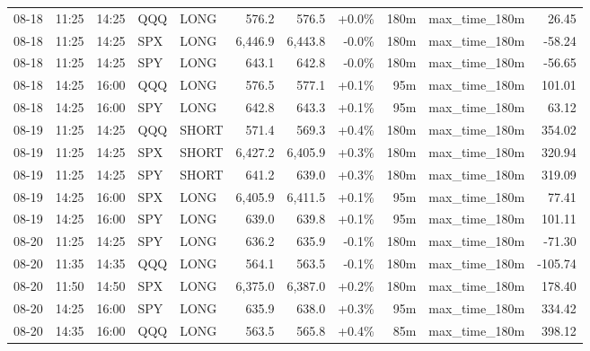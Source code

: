 \documentclass[11pt,a4paper,twoside]{article}
\begin{document}
\begin{center}
\begin{longtable}{>{\color{txtmain}}l l l l l r r r r >{\color{txtmain}}l r}
08-18 & 11:25 & 14:25 & QQQ & LONG & 576.2 & 576.5 & \textcolor{wingreen}{+0.0\%} & 180m & max\_time\_180m & \textcolor{wingreen}{26.45} \\
08-18 & 11:25 & 14:25 & SPX & LONG & 6,446.9 & 6,443.8 & \textcolor{lossred}{-0.0\%} & 180m & max\_time\_180m & \textcolor{lossred}{-58.24} \\
08-18 & 11:25 & 14:25 & SPY & LONG & 643.1 & 642.8 & \textcolor{lossred}{-0.0\%} & 180m & max\_time\_180m & \textcolor{lossred}{-56.65} \\
08-18 & 14:25 & 16:00 & QQQ & LONG & 576.5 & 577.1 & \textcolor{wingreen}{+0.1\%} & 95m & max\_time\_180m & \textcolor{wingreen}{101.01} \\
08-18 & 14:25 & 16:00 & SPY & LONG & 642.8 & 643.3 & \textcolor{wingreen}{+0.1\%} & 95m & max\_time\_180m & \textcolor{wingreen}{63.12} \\
08-19 & 11:25 & 14:25 & QQQ & SHORT & 571.4 & 569.3 & \textcolor{wingreen}{+0.4\%} & 180m & max\_time\_180m & \textcolor{wingreen}{354.02} \\
08-19 & 11:25 & 14:25 & SPX & SHORT & 6,427.2 & 6,405.9 & \textcolor{wingreen}{+0.3\%} & 180m & max\_time\_180m & \textcolor{wingreen}{320.94} \\
08-19 & 11:25 & 14:25 & SPY & SHORT & 641.2 & 639.0 & \textcolor{wingreen}{+0.3\%} & 180m & max\_time\_180m & \textcolor{wingreen}{319.09} \\
08-19 & 14:25 & 16:00 & SPX & LONG & 6,405.9 & 6,411.5 & \textcolor{wingreen}{+0.1\%} & 95m & max\_time\_180m & \textcolor{wingreen}{77.41} \\
08-19 & 14:25 & 16:00 & SPY & LONG & 639.0 & 639.8 & \textcolor{wingreen}{+0.1\%} & 95m & max\_time\_180m & \textcolor{wingreen}{101.11} \\
08-20 & 11:25 & 14:25 & SPY & LONG & 636.2 & 635.9 & \textcolor{lossred}{-0.1\%} & 180m & max\_time\_180m & \textcolor{lossred}{-71.30} \\
08-20 & 11:35 & 14:35 & QQQ & LONG & 564.1 & 563.5 & \textcolor{lossred}{-0.1\%} & 180m & max\_time\_180m & \textcolor{lossred}{-105.74} \\
08-20 & 11:50 & 14:50 & SPX & LONG & 6,375.0 & 6,387.0 & \textcolor{wingreen}{+0.2\%} & 180m & max\_time\_180m & \textcolor{wingreen}{178.40} \\
08-20 & 14:25 & 16:00 & SPY & LONG & 635.9 & 638.0 & \textcolor{wingreen}{+0.3\%} & 95m & max\_time\_180m & \textcolor{wingreen}{334.42} \\
08-20 & 14:35 & 16:00 & QQQ & LONG & 563.5 & 565.8 & \textcolor{wingreen}{+0.4\%} & 85m & max\_time\_180m & \textcolor{wingreen}{398.12} \\

\end{longtable}
\end{center}
\end{document}
